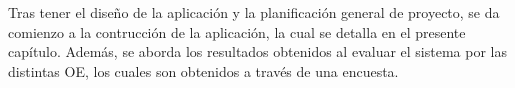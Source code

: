 Tras tener el diseño de la aplicación y la planificación general de proyecto, se da comienzo a la contrucción de la aplicación, la cual se detalla en el presente capítulo. Además, se aborda los resultados obtenidos al evaluar el sistema por las distintas OE, los cuales son obtenidos a través de una encuesta.





